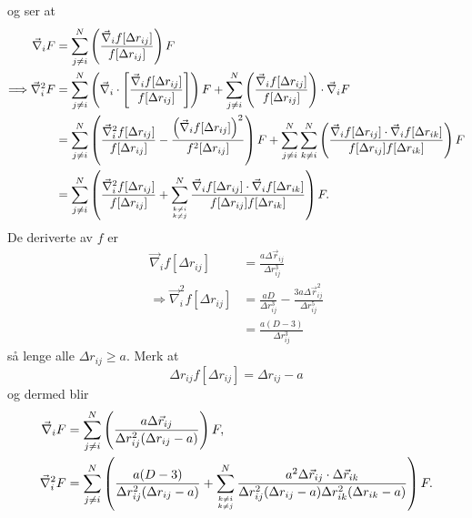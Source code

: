 \documentclass[pdftex,10pt,b5paper,twoside]{book}
\begin{document}
og ser at
\begin{align}
\vec{\nabla}_i F &= \sum\limits_{j \neq i}^N \left(\frac{\vec{\nabla}_i f[\Delta{r}_{ij}]}{f[\Delta{r}_{ij}]}\right) F \\
\Longrightarrow \vec{\nabla}_i^2 F &= \sum\limits_{j \neq i}^N \left(\vec{\nabla}_i\cdot\left[\frac{\vec{\nabla}_i f[\Delta{r}_{ij}]}{f[\Delta{r}_{ij}]}\right]\right) F + \sum\limits_{j \neq i}^N \left(\frac{\vec{\nabla}_i f[\Delta{r}_{ij}]}{f[\Delta{r}_{ij}]}\right)\cdot \vec{\nabla}_i F \nonumber\\
&= \sum\limits_{j \neq i}^N \left(\frac{\vec{\nabla}_i^2 f[\Delta{r}_{ij}]}{f[\Delta{r}_{ij}]} - \frac{\left(\vec{\nabla}_i f[\Delta{r}_{ij}]\right)^2}{f^2[\Delta{r}_{ij}]}\right) F + \sum\limits_{j \neq i}^N \sum\limits_{k \neq i}^N \left(\frac{\vec{\nabla}_i f[\Delta{r}_{ij}] \cdot\vec{\nabla}_i f[\Delta{r}_{ik}]}{f[\Delta{r}_{ij}]f[\Delta{r}_{ik}]}\right) F \nonumber\\
&= \sum\limits_{j \neq i}^N \left(\frac{\vec{\nabla}_i^2 f[\Delta{r}_{ij}]}{f[\Delta{r}_{ij}]} + \sum\limits_{{k \neq i}\atop{k \neq j}}^N \frac{\vec{\nabla}_i f[\Delta{r}_{ij}] \cdot\vec{\nabla}_i f[\Delta{r}_{ik}]}{f[\Delta{r}_{ij}]f[\Delta{r}_{ik}]}\right) F.
\end{align}
De deriverte av $f$ er
\begin{align}
\vec{\nabla}_i f[\Delta{r}_{ij}] &= \frac{a\Delta\vec{r}_{ij}}{\Delta{r}_{ij}^3} \\
\Longrightarrow \vec{\nabla}_i^2 f[\Delta{r}_{ij}]
&= \frac{aD}{\Delta{r}_{ij}^3}-\frac{3a\Delta\vec{r}_{ij}^2}{\Delta{r}_{ij}^5} \nonumber\\
&= \frac{a(D-3)}{\Delta{r}_{ij}^3}
\end{align}
så lenge alle $\Delta{r}_{ij} \geq a$. Merk at
\begin{equation}
\Delta{r}_{ij} f[\Delta{r}_{ij}] = \Delta{r}_{ij}-a
\end{equation}
og dermed blir
\begin{align}
\vec{\nabla}_i F &= \sum\limits_{j \neq i}^N \left(\frac{a\Delta\vec{r}_{ij}}{\Delta{r}_{ij}^2(\Delta{r}_{ij}-a)}\right) F, \label{grad_F}\\
\vec{\nabla}_i^2 F &= \sum\limits_{j \neq i}^N \left(\frac{a(D-3)}{\Delta{r}_{ij}^2(\Delta{r}_{ij}-a)} + \sum\limits_{{k \neq i}\atop{k \neq j}}^N \frac{a^2 \Delta\vec{r}_{ij} \cdot \Delta\vec{r}_{ik}}{\Delta{r}_{ij}^2(\Delta{r}_{ij}-a) \Delta{r}_{ik}^2(\Delta{r}_{ik}-a)}\right) F. \label{Lap_F}
\end{align}
\end{document}
